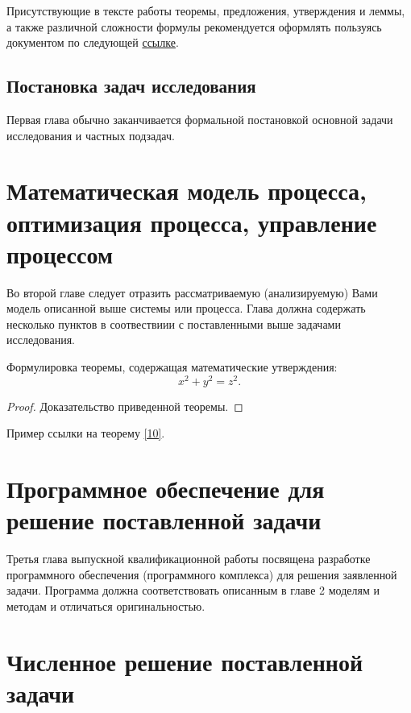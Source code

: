 Присутствующие в тексте работы теоремы, предложения, утверждения и леммы, а также различной сложности формулы рекомендуется оформлять пользуясь документом по следующей \href{http://mcc-conf.ru/d/math_in_latex.pdf}{ссылке}. 

\subsection{Постановка задач исследования}

Первая глава обычно заканчивается формальной постановкой основной задачи исследования и частных подзадач.


\newpage

\section{Математическая модель процесса, оптимизация процесса, управление процессом}

Во второй главе следует отразить рассматриваемую (анализируемую) Вами модель описанной выше системы или процесса. Глава должна содержать несколько пунктов в соотвествиии с поставленными выше задачами исследования.


\begin{theorem} \label{10}
	Формулировка теоремы, содержащая математические утверждения:
	\begin{equation*}
	x^2 + y^2 = z^2.
	\end{equation*}
\end{theorem}

\begin{proof}
	Доказательство приведенной теоремы. \qedhere
\end{proof}
	
Пример ссылки на теорему \ref{10}.


\newpage

\section{Программное обеспечение для решение поставленной задачи}

Третья глава выпускной квалификационной работы посвящена разработке программного обеспечения (программного комплекса) для решения заявленной задачи. Программа должна соответствовать описанным в главе 2 моделям и методам и отличаться оригинальностью.

\newpage

\section{Численное решение поставленной задачи}

